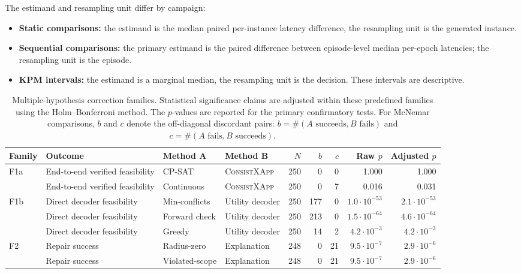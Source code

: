 \documentclass[pdflatex,sn-mathphys-num,iicol,oneside]{sn-jnl}
\newcommand{\method}{\textsc{ConsistXApp}\xspace}
\newcommand{\cpsat}{\textsc{CP-SAT}\xspace}
\begin{document}
The estimand and resampling unit differ by campaign:
\begin{itemize}[leftmargin=1.4em]
\item \textbf{Static comparisons:} the estimand is the median paired
per-instance latency difference, the resampling unit is the
generated instance.
\item \textbf{Sequential comparisons:} the primary estimand is the
paired difference between episode-level median per-epoch latencies;
the resampling unit is the episode.
\item \textbf{KPM intervals:} the estimand is a marginal median, the
resampling unit is the decision. These intervals are descriptive.
\end{itemize}

\begin{table}[t]
\centering
\caption{Multiple-hypothesis correction families. Statistical significance claims are adjusted within these predefined families using the Holm--Bonferroni method. The $p$-values are reported for the primary confirmatory tests. For McNemar comparisons, $b$ and $c$ denote the off-diagonal discordant pairs: $b=\#(A\text{ succeeds},B\text{ fails})$ and $c=\#(A\text{ fails},B\text{ succeeds})$.}
\label{tab:families}
\setlength{\tabcolsep}{3.5pt}
\small
\begin{tabular}{llllrrrrr}
\toprule
Family & Outcome & Method A & Method B & $N$ & $b$ & $c$ & Raw $p$ & Adjusted $p$ \\
\midrule
F1a & End-to-end verified feasibility & \cpsat & \method & 250 & 0 & 0 & 1.000 & 1.000 \\
    & End-to-end verified feasibility & Continuous & \method & 250 & 0 & 7 & 0.016 & 0.031 \\
\midrule
F1b & Direct decoder feasibility & Min-conflicts & Utility decoder & 250 & 177 & 0 & $1.0\cdot 10^{-53}$ & $2.1\cdot 10^{-53}$ \\
    & Direct decoder feasibility & Forward check & Utility decoder & 250 & 213 & 0 & $1.5\cdot 10^{-64}$ & $4.6\cdot 10^{-64}$ \\
    & Direct decoder feasibility & Greedy & Utility decoder & 250 & 14 & 2 & $4.2\cdot 10^{-3}$ & $4.2\cdot 10^{-3}$ \\
\midrule
F2 & Repair success & Radius-zero & Explanation & 248 & 0 & 21 & $9.5\cdot 10^{-7}$ & $2.9\cdot 10^{-6}$ \\
   & Repair success & Violated-scope & Explanation & 248 & 0 & 21 & $9.5\cdot 10^{-7}$ & $2.9\cdot 10^{-6}$ \\

\end{tabular}
\end{table}
\end{document}
